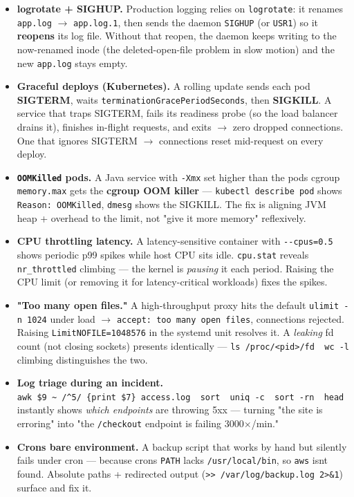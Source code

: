\documentclass[11pt]{article}
\begin{document}
\begin{itemize}
\item
  \textbf{logrotate + SIGHUP.} Production logging relies on \texttt{logrotate}: it renames \texttt{app.log} \(\rightarrow\) \texttt{app.log.1}, then sends the daemon \texttt{SIGHUP} (or \texttt{USR1}) so it \textbf{reopens} its log file. Without that reopen, the daemon keeps writing to the now-renamed inode (the deleted-open-file problem in slow motion) and the new \texttt{app.log} stays empty.
\item
  \textbf{Graceful deploys (Kubernetes).} A rolling update sends each pod \textbf{SIGTERM}, waits \texttt{terminationGracePeriodSeconds}, then \textbf{SIGKILL}. A service that traps SIGTERM, fails its readiness probe (so the load balancer drains it), finishes in-flight requests, and exits \(\rightarrow\) zero dropped connections. One that ignores SIGTERM \(\rightarrow\) connections reset mid-request on every deploy.
\item
  \textbf{\texttt{OOMKilled} pods.} A Java service with \texttt{-Xmx} set higher than the pod\textquotesingle s cgroup \texttt{memory.max} gets the \textbf{cgroup OOM killer} --- \texttt{kubectl\ describe\ pod} shows \texttt{Reason:\ OOMKilled}, \texttt{dmesg} shows the SIGKILL. The fix is aligning JVM heap + overhead to the limit, not "give it more memory" reflexively.
\item
  \textbf{CPU throttling latency.} A latency-sensitive container with \texttt{-\/-cpus=0.5} shows periodic p99 spikes while host CPU sits idle. \texttt{cpu.stat} reveals \texttt{nr\_throttled} climbing --- the kernel is \emph{pausing} it each period. Raising the CPU limit (or removing it for latency-critical workloads) fixes the spikes.
\item
  \textbf{"Too many open files."} A high-throughput proxy hits the default \texttt{ulimit\ -n\ 1024} under load \(\rightarrow\) \texttt{accept:\ too\ many\ open\ files}, connections rejected. Raising \texttt{LimitNOFILE=1048576} in the systemd unit resolves it. A \emph{leaking} fd count (not closing sockets) presents identically --- \texttt{ls\ /proc/\textless{}pid\textgreater{}/fd\ \textbar{}\ wc\ -l} climbing distinguishes the two.
\item
  \textbf{Log triage during an incident.} \texttt{awk\ \textquotesingle{}\$9\ \textasciitilde{}\ /\^{}5/\ \{print\ \$7\}\textquotesingle{}\ access.log\ \textbar{}\ sort\ \textbar{}\ uniq\ -c\ \textbar{}\ sort\ -rn\ \textbar{}\ head} instantly shows \emph{which endpoints} are throwing 5xx --- turning "the site is erroring" into "the \texttt{/checkout} endpoint is failing 3000\(\times\)/min."
\item
  \textbf{Cron\textquotesingle s bare environment.} A backup script that works by hand but silently fails under cron --- because cron\textquotesingle s \texttt{PATH} lacks \texttt{/usr/local/bin}, so \texttt{aws} isn\textquotesingle t found. Absolute paths + redirected output (\texttt{\textgreater{}\textgreater{}\ /var/log/backup.log\ 2\textgreater{}\&1}) surface and fix it.
\end{itemize}
\end{document}
